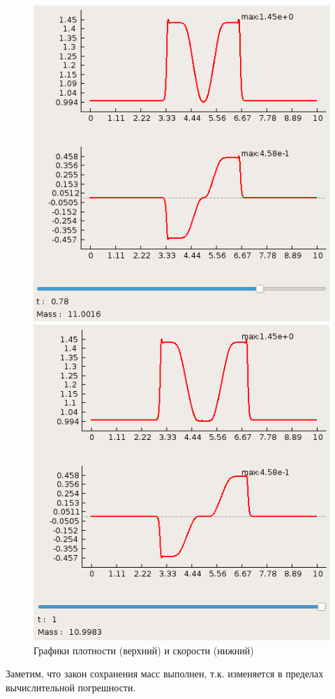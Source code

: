 \documentclass[a4paper, 11pt]{article}
\begin{document}
\begin{figure}[H]
	\begin{minipage}[H] {0.49\linewidth}
		\includegraphics[width=1\linewidth]{p1/p1_t=0,78_supr.png}
	\end{minipage}
	\begin{minipage}[H] {0.49\linewidth}
		\includegraphics[width=1\linewidth]{p1/p1_t=1_supr.png}
	\end{minipage}
	\caption{Графики плотности (верхний) и скорости (нижний)}
\end{figure}
Заметим, что закон сохранения масс выполнен, т.к. изменяется в пределах вычислительной погрешности.
\end{document}
